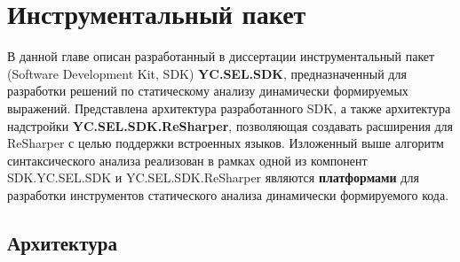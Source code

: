 \chapter{Инструментальный пакет} \label{relWorks}

В данной главе описан разработанный в диссертации инструментальный пакет (Software Development Kit, SDK) \textbf{YC.SEL.SDK}, предназначенный для разработки решений по статическому анализу динамически формируемых выражений. Представлена архитектура разработанного SDK, а также архитектура надстройки \textbf{YC.SEL.SDK.ReSharper}, позволяющая создавать расширения для ReSharper с целью поддержки встроенных языков. Изложенный выше алгоритм синтаксического анализа реализован в рамках одной из компонент SDK.YC.SEL.SDK и YC.SEL.SDK.ReSharper являются \textbf{платформами} для разработки инструментов статического анализа динамически формируемого кода.

\section{Архитектура}

